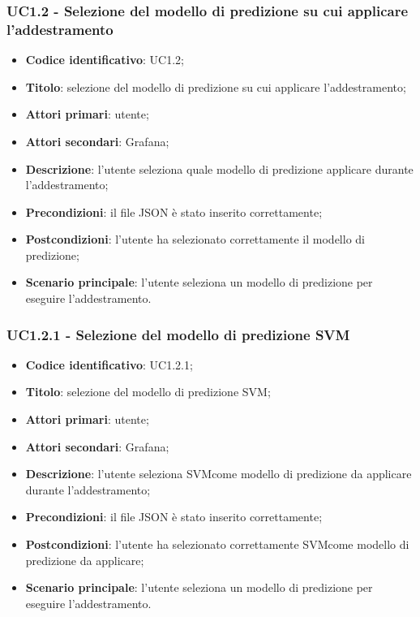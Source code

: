 \subsubsection{UC1.2 - Selezione del modello di predizione su cui applicare l'addestramento}
\begin{itemize}
	\item \textbf{Codice identificativo}: UC1.2;
	\item \textbf{Titolo}: selezione del modello di predizione su cui applicare l'addestramento;
	\item \textbf{Attori primari}: utente;
	\item \textbf{Attori secondari}: Grafana\glo;
	\item \textbf{Descrizione}: l'utente seleziona quale modello di predizione applicare durante l'addestramento;
	\item \textbf{Precondizioni}: il file JSON è stato inserito correttamente;
	\item \textbf{Postcondizioni}: l'utente ha selezionato correttamente il modello di predizione;
	\item \textbf{Scenario principale}: l'utente seleziona un modello di predizione per eseguire l'addestramento.
\end{itemize}
\subsubsection{UC1.2.1 - Selezione del modello di predizione SVM}
\begin{itemize}
	\item \textbf{Codice identificativo}: UC1.2.1;
	\item \textbf{Titolo}: selezione del modello di predizione SVM\glo;
	\item \textbf{Attori primari}: utente;
	\item \textbf{Attori secondari}: Grafana\glo;
	\item \textbf{Descrizione}: l'utente seleziona SVM\glosp come modello di predizione da applicare durante l'addestramento;
	\item \textbf{Precondizioni}: il file JSON è stato inserito correttamente;
	\item \textbf{Postcondizioni}: l'utente ha selezionato correttamente SVM\glosp come modello di predizione da applicare;
	\item \textbf{Scenario principale}: l'utente seleziona un modello di predizione per eseguire l'addestramento.
\end{itemize}
